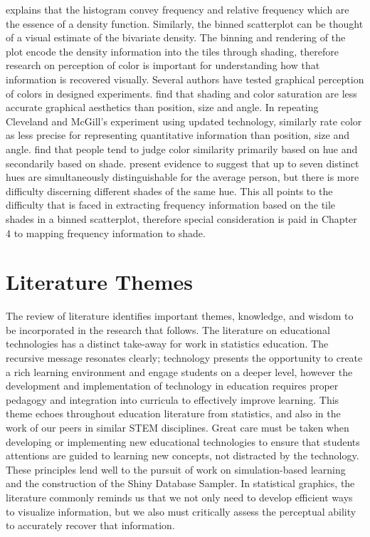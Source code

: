 \documentclass[11pt]{isuthesis}
\newcommand\chaptocbreak{
	\addtocontents{toc}{\protect\needspace{4\baselineskip}}
	\addtocontents{lof}{\protect\needspace{2\baselineskip}}
	\addtocontents{lot}{\protect\needspace{2\baselineskip}}
}
\begin{document}
\citet{scott1992} explains that the histogram convey frequency and relative frequency which are the essence of a density function. Similarly, the binned scatterplot can be thought of a visual estimate of the bivariate density. The binning and rendering of the plot encode the density information into the tiles through shading, therefore research on perception of color is important for understanding how that information is recovered visually. Several authors have tested graphical perception of colors in designed experiments. \citet{cleveland1984graphical} find that shading and color saturation are less accurate graphical aesthetics than position, size and angle. In repeating Cleveland and McGill's experiment using updated technology, \citet{heer2010crowdsourcing} similarly rate color as less precise for representing quantitative information than position, size and angle. \citet{demiralp2014learning} find that people tend to judge color similarity primarily based on hue and secondarily based on shade. \citet{healey1999large} present evidence to suggest that up to seven distinct hues are simultaneously distinguishable for the average person, but there is more difficulty discerning different shades of the same hue. This all points to the difficulty that is faced in extracting frequency information based on the tile shades in a binned scatterplot, therefore special consideration is paid in Chapter 4 to mapping frequency information to shade.


\section{Literature Themes}

The review of literature identifies important themes, knowledge, and wisdom to be incorporated in the research that follows. The literature on educational technologies has a distinct take-away for work in statistics education. The recursive message resonates clearly; technology presents the opportunity to create a rich learning environment and engage students on a deeper level, however the development and implementation of technology in education requires proper pedagogy and integration into curricula to effectively improve learning. This theme echoes throughout education literature from statistics, and also in the work of our peers in similar STEM disciplines. Great care must be taken when developing or implementing new educational technologies to ensure that students attentions are guided to learning new concepts, not distracted by the technology. These principles lend well to the pursuit of work on simulation-based learning and the construction of the Shiny Database Sampler. In statistical graphics, the literature commonly reminds us that we not only need to develop efficient ways to visualize information, but we also must critically assess the perceptual ability to accurately recover that information. 
 \chaptocbreak
\end{document}
